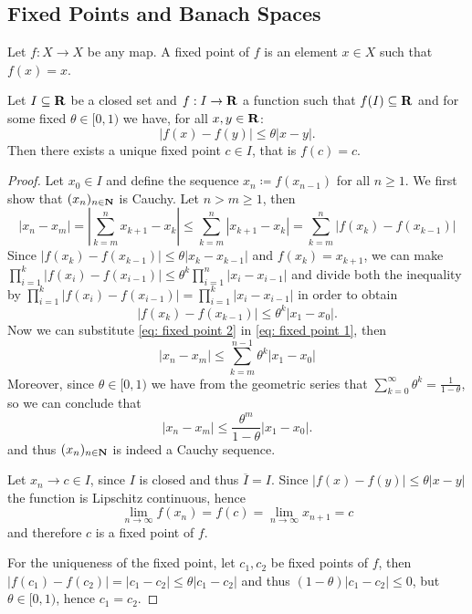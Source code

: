 \subsection{Fixed Points and Banach Spaces}

\begin{definition}\label{def:fixed-point}
Let \(f: X \to X\) be any map. A fixed point of \(f\) is an element \(x \in X\)
such that \(f(x) = x\).
\end{definition}

\begin{theorem}\label{thm: fixed point}
Let \(I \subseteq \mathbf{R}\) be a closed set and \(f: I \to \mathbf{R}\) a
function such that \(f(I) \subseteq \mathbf{R}\) and for some fixed \(\theta
\in [0, 1)\) we have, for all \(x, y \in \mathbf{R}\):
\[
|f(x) - f(y)| \leq \theta |x - y|.
\]
Then there exists a unique fixed point \(c \in I\), that is \(f(c) = c\).
\end{theorem}

\begin{proof}
Let \(x_0 \in I\) and define the sequence \(x_n \coloneq f(x_{n-1})\) for all \(n
\geq 1\). We first show that \((x_n)_{n \in \mathbf{N}}\) is Cauchy. Let \(n >
m \geq 1\), then
\begin{equation}\label{eq: fixed point 1}
|x_n - x_m| = \left| \sum_{k=m}^n x_{k+1} - x_k \right|
\leq \sum_{k=m}^n |x_{k+1} - x_k| = \sum_{k=m}^n |f(x_k) - f(x_{k-1})|
\end{equation}
Since \(|f(x_k) - f(x_{k-1})| \leq \theta |x_k - x_{k-1}|\) and \(f(x_k) =
x_{k+1}\), we can make  \(\prod_{i=1}^k |f(x_i) - f(x_{i-1})| \leq \theta^k
\prod_{i=1}^n |x_i - x_{i-1}|\) and divide both the inequality by
\(\prod_{i=1}^k |f(x_i) - f(x_{i-1})| = \prod_{i=1}^k |x_i - x_{i-1}|\) in
order to obtain
\begin{equation}\label{eq: fixed point 2}
|f(x_k) - f(x_{k-1})| \leq \theta^k |x_1 - x_0|.
\end{equation}
Now we can substitute \cref{eq: fixed point 2} in \cref{eq: fixed point 1},
then
\[
|x_n - x_m| \leq \sum_{k=m}^{n-1} \theta^k |x_1 - x_0|
\]
Moreover, since \(\theta \in [0, 1)\) we have from the geometric series that
\(\sum_{k=0}^\infty \theta^k = \frac{1}{1-\theta}\), so we can conclude that
\[
|x_n - x_m| \leq \frac{\theta^m}{1 - \theta} |x_1 - x_0|.
\]
and thus \((x_n)_{n \in \mathbf{N}}\) is indeed a Cauchy sequence.

Let \(x_n \to c \in I\), since \(I\) is closed and thus \(\overline I = I\).
Since \(|f(x) - f(y)| \leq \theta |x - y|\) the function is Lipschitz
continuous, hence
\[
\lim_{n \to \infty} f(x_n) = f(c) = \lim_{n \to \infty} x_{n+1} = c
\]
and therefore \(c\) is a fixed point of \(f\).

For the uniqueness of the fixed point, let \(c_1, c_2\) be fixed points of
\(f\), then \(|f(c_1) - f(c_2)| = |c_1 - c_2| \leq \theta |c_1 - c_2|\) and
thus \((1 - \theta)|c_1 - c_2| \leq 0\), but \(\theta \in [0, 1)\), hence
\(c_1 = c_2\).
\end{proof}

